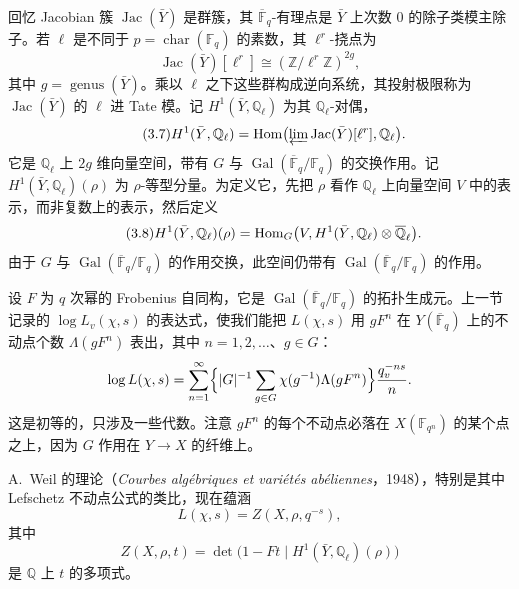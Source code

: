 回忆 Jacobian 簇 $\operatorname{Jac}(\bar Y)$ 是群簇，其 $\overline{\mathbb{F}}_q$-有理点是 $\bar Y$ 上次数 $0$ 的除子类模主除子。若 $\ell$ 是不同于 $p=\operatorname{char}(\mathbb{F}_q)$ 的素数，其 $\ell^{r}$-挠点为
\begin{equation}\tag{3.6}\label{c4:eq:3.6}
\operatorname{Jac}(\bar Y)[\ell^{r}]\cong(\mathbb{Z}/\ell^{r}\mathbb{Z})^{2g},
\end{equation}
其中 $g=\operatorname{genus}(\bar Y)$。乘以 $\ell$ 之下这些群构成逆向系统，其投射极限称为 $\operatorname{Jac}(\bar Y)$ 的 $\ell$ 进 Tate 模。记 $H^{1}(\bar Y,\mathbb{Q}_\ell)$ 为其 $\mathbb{Q}_\ell$-对偶，
\begin{equation}\tag{3.7}\label{c4:eq:3.7}
H^{1}(\bar Y,\mathbb{Q}_\ell)=\operatorname{Hom}\bigl(\varprojlim\operatorname{Jac}(\bar Y)[\ell^{r}],\mathbb{Q}_\ell\bigr).
\end{equation}
它是 $\mathbb{Q}_\ell$ 上 $2g$ 维向量空间，带有 $G$ 与 $\operatorname{Gal}(\overline{\mathbb{F}}_q/\mathbb{F}_q)$ 的交换作用。记 $H^{1}(\bar Y,\mathbb{Q}_\ell)(\rho)$ 为 $\rho$-等型分量。为定义它，先把 $\rho$ 看作 $\mathbb{Q}_\ell$ 上向量空间 $V$ 中的表示，而非复数上的表示，然后定义
\begin{equation}\tag{3.8}\label{c4:eq:3.8}
H^{1}(\bar Y,\mathbb{Q}_\ell)(\rho)=\operatorname{Hom}_G\bigl(V,H^{1}(\bar Y,\mathbb{Q}_\ell)\otimes\overline{\mathbb{Q}}_\ell\bigr).
\end{equation}
由于 $G$ 与 $\operatorname{Gal}(\overline{\mathbb{F}}_q/\mathbb{F}_q)$ 的作用交换，此空间仍带有 $\operatorname{Gal}(\overline{\mathbb{F}}_q/\mathbb{F}_q)$ 的作用。

设 $F$ 为 $q$ 次幂的 Frobenius 自同构，它是 $\operatorname{Gal}(\overline{\mathbb{F}}_q/\mathbb{F}_q)$ 的拓扑生成元。上一节记录的 $\log L_v(\chi,s)$ 的表达式，使我们能把 $L(\chi,s)$ 用 $gF^{n}$ 在 $Y(\overline{\mathbb{F}}_q)$ 上的不动点个数 $\Lambda(gF^{n})$ 表出，其中 $n=1,2,\dots$、$g\in G$：
\[
\log L(\chi,s)=\sum_{n=1}^{\infty}\Bigl\{|G|^{-1}\sum_{g\in G}\chi(g^{-1})\Lambda(gF^{n})\Bigr\}\frac{q_v^{-ns}}{n}.
\]
这是初等的，只涉及一些代数。注意 $gF^{n}$ 的每个不动点必落在 $X(\mathbb{F}_{q^{n}})$ 的某个点之上，因为 $G$ 作用在 $Y\to X$ 的纤维上。

A.~Weil 的理论（\emph{Courbes algébriques et variétés abéliennes}，1948），特别是其中 Lefschetz 不动点公式的类比，现在蕴涵
\begin{equation}\tag{3.9}\label{c4:eq:3.9}
L(\chi,s)=Z(X,\rho,q^{-s}),
\end{equation}
其中
\begin{equation}\tag{3.10}\label{c4:eq:3.10}
Z(X,\rho,t)=\det\bigl(1-Ft\mid H^{1}(\bar Y,\mathbb{Q}_\ell)(\rho)\bigr)
\end{equation}
是 $\mathbb{Q}$ 上 $t$ 的多项式。

